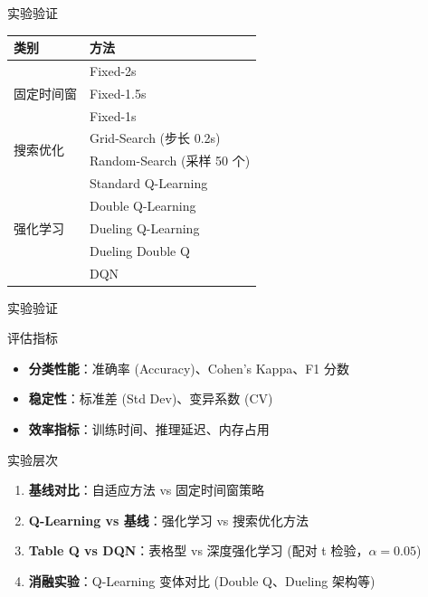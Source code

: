 \documentclass[aspectratio=169, 10pt]{beamer}
\begin{document}
\begin{frame}{实验验证}
\begin{table}
\centering
\small
\begin{tabular}{ll}
\toprule
\textbf{类别} & \textbf{方法} \\
\midrule
\multirow{3}{*}{固定时间窗} & Fixed-2s \\
& Fixed-1.5s \\
& Fixed-1s \\
\midrule
\multirow{2}{*}{搜索优化} & Grid-Search (步长 0.2s) \\
& Random-Search (采样 50 个) \\
\midrule
\multirow{5}{*}{强化学习} & Standard Q-Learning \\
& Double Q-Learning \\
& Dueling Q-Learning \\
& Dueling Double Q \\
& DQN \\
\bottomrule
\end{tabular}
\end{table}
\end{frame}

\begin{frame}{实验验证}
\begin{block}{评估指标}
\begin{itemize}
    \item \textbf{分类性能}：准确率 (Accuracy)、Cohen's Kappa、F1 分数
    \item \textbf{稳定性}：标准差 (Std Dev)、变异系数 (CV)
    \item \textbf{效率指标}：训练时间、推理延迟、内存占用
\end{itemize}
\end{block}

\vspace{0.3cm}
\begin{block}{实验层次}
\begin{enumerate}
    \item \textbf{基线对比}：自适应方法 vs 固定时间窗策略
    \item \textbf{Q-Learning vs 基线}：强化学习 vs 搜索优化方法
    \item \textbf{Table Q vs DQN}：表格型 vs 深度强化学习 (配对 t 检验，$\alpha = 0.05$)
    \item \textbf{消融实验}：Q-Learning 变体对比 (Double Q、Dueling 架构等)
\end{enumerate}
\end{block}
\end{frame}
\end{document}
